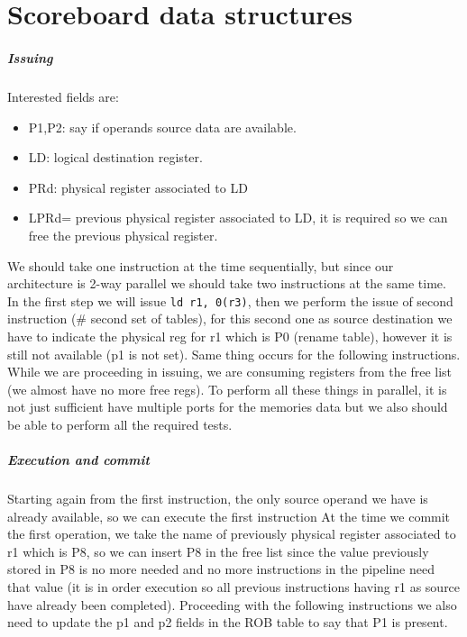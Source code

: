 \section{Scoreboard data structures}

\subparagraph{Issuing}
Interested fields are:
\begin{itemize}
\item P1,P2: say if operands source data are available.
\item LD: logical destination register.
\item PRd: physical register associated to LD
\item LPRd= previous physical register associated to LD, it is required so we can free the previous physical register.
\end{itemize}


We should take one instruction at the time sequentially, but since our architecture is 2-way parallel we should take two instructions at the same time. In the first step we will issue \verb|ld r1, 0(r3)|, then we perform the issue of second instruction (\# second set of tables), for this second one as source destination we have to indicate the physical reg for r1 which is P0 (rename table), however it is still not available (p1 is not set). Same thing occurs for the following instructions. While we are proceeding in issuing, we are consuming registers from the free list (we almost have no more free regs). To perform all these things in parallel, it is not just sufficient have multiple ports for the memories data but we also should be able to perform all the required tests.

\subparagraph{Execution and commit}
Starting again from the first instruction, the only source operand we have is already available, so we can execute the first instruction At the time we commit the first operation, we take the name of previously physical register associated to r1 which is P8, so we can insert P8 in the free list since the value previously stored in P8 is no more needed and no more instructions in the pipeline need that value (it is in order execution so all previous instructions having r1 as source have already been completed). Proceeding with the following instructions we also need to update the p1 and p2 fields in the ROB table to say that P1 is present.


